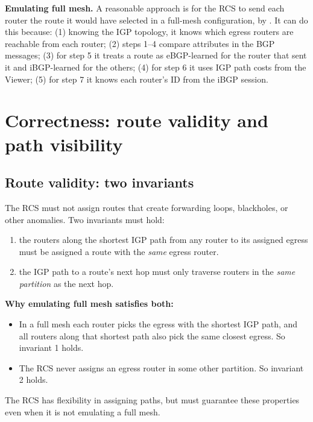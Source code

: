 \textbf{Emulating full mesh.} A reasonable approach is for the RCS to send each router the route it would have selected in a full-mesh configuration, by . It can do this because: (1) knowing the IGP topology, it knows which egress routers are reachable from each router; (2) steps 1--4 compare attributes in the BGP messages; (3) for step 5 it treats a route as eBGP-learned for the router that sent it and iBGP-learned for the others; (4) for step 6 it uses IGP path costs from the Viewer; (5) for step 7 it knows each router's ID from the iBGP session.

\section{Correctness: route validity and path visibility}
\subsection{Route validity: two invariants}
The RCS must not assign routes that create forwarding loops, blackholes, or other anomalies. Two invariants must hold:
\begin{enumerate}
\item {} the routers along the shortest IGP path from any router to its assigned egress must be assigned a route with the \emph{same} egress router.
\item {} the IGP path to a route's next hop must only traverse routers in the \emph{same partition} as the next hop.
\end{enumerate}
\textbf{Why emulating full mesh satisfies both:}
\begin{itemize}
\item In a full mesh each router picks the egress with the shortest IGP path, and all routers along that shortest path also pick the same closest egress. So invariant 1 holds.
\item The RCS never assigns an egress router in some other partition. So invariant 2 holds.
\end{itemize}
The RCS has flexibility in assigning paths, but must guarantee these properties even when it is not emulating a full mesh.

